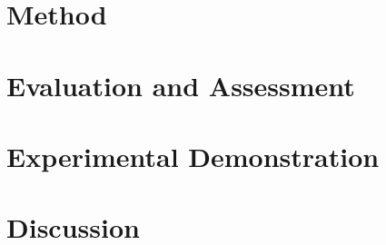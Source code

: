 \documentclass[10pt,twocolumn,letterpaper]{article}
\begin{document}
\section{Method}
\label{sec:method}


\section{Evaluation and Assessment}
\label{sec:evaluation}


\section{Experimental Demonstration}
\label{sec:prototype}


\section{Discussion}
\label{sec:discussion}


{\small


}
\end{document}
